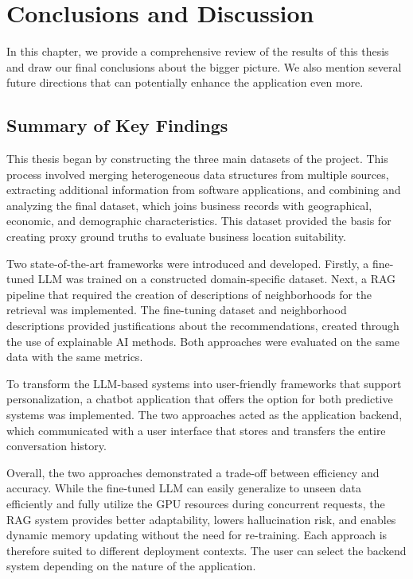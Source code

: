 \chapter{Conclusions and Discussion}
\label{chap6}



In this chapter, we provide a comprehensive review of the results of this thesis and draw our final conclusions about the bigger picture. We also mention several future directions that can potentially enhance the application even more.


\section{Summary of Key Findings}

This thesis began by constructing the three main datasets of the project. This process involved merging heterogeneous data structures from multiple sources, extracting additional information from software applications, and combining and analyzing the final dataset, which joins business records with geographical, economic, and demographic characteristics. This dataset provided the basis for creating proxy ground truths to evaluate business location suitability.

Two state-of-the-art frameworks were introduced and developed. Firstly, a fine-tuned LLM was trained on a constructed domain-specific dataset. Next, a RAG pipeline that required the creation of descriptions of neighborhoods for the retrieval was implemented. The fine-tuning dataset and neighborhood descriptions provided justifications about the recommendations, created through the use of explainable AI methods. Both approaches were evaluated on the same data with the same metrics.

To transform the LLM-based systems into user-friendly frameworks that support personalization, a chatbot application that offers the option for both predictive systems was implemented. The two approaches acted as the application backend, which communicated with a user interface that stores and transfers the entire conversation history.

Overall, the two approaches demonstrated a trade-off between efficiency and accuracy. While the fine-tuned LLM can easily generalize to unseen data efficiently and fully utilize the GPU resources during concurrent requests, the RAG system provides better adaptability, lowers hallucination risk, and enables dynamic memory updating without the need for re-training. Each approach is therefore suited to different deployment contexts. The user can select the backend system depending on the nature of the application.

